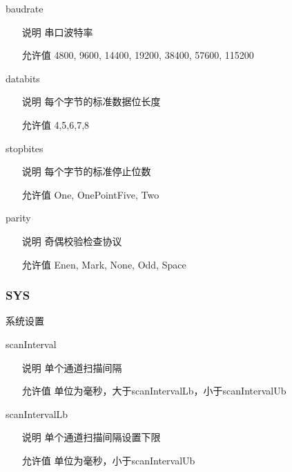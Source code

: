 \begin{definition}{baudrate}{}
    \begin{itemize}
        \item[说明] 串口波特率
        \item[允许值] 4800, 9600, 14400, 19200, 38400, 57600, 115200
    \end{itemize}
\end{definition}

\begin{definition}{databits}{}
    \begin{itemize}
        \item[说明] 每个字节的标准数据位长度
        \item[允许值] 4,5,6,7,8
    \end{itemize}
\end{definition}

\begin{definition}{stopbites}{}
    \begin{itemize}
        \item[说明] 每个字节的标准停止位数
        \item[允许值] One, OnePointFive, Two
    \end{itemize}
\end{definition}

\begin{definition}{parity}{}
    \begin{itemize}
        \item[说明] 奇偶校验检查协议
        \item[允许值] Enen, Mark, None, Odd, Space
    \end{itemize}
\end{definition}

\subsubsection*{SYS}

系统设置

\begin{definition}{scanInterval}{}
    \begin{itemize}
        \item[说明] 单个通道扫描间隔
        \item[允许值] 单位为毫秒，大于scanIntervalLb，小于scanIntervalUb
    \end{itemize}
\end{definition}

\begin{definition}{scanIntervalLb}{}
    \begin{itemize}
        \item[说明] 单个通道扫描间隔设置下限
        \item[允许值] 单位为毫秒，小于scanIntervalUb
    \end{itemize}
\end{definition}

